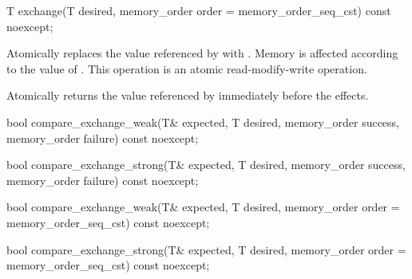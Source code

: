 %
%
%
%
\begin{itemdecl}
T exchange(T desired, memory_order order = memory_order_seq_cst) const noexcept;
\end{itemdecl}

\begin{itemdescr}
\pnum
\effects Atomically replaces the value referenced by 
with .
Memory is affected according to the value of .
This operation is an atomic read-modify-write operation.

\pnum
\returns Atomically returns the value referenced by 
immediately before the effects.
\end{itemdescr}

%
%
%
%
%
%
%
%
\begin{itemdecl}
bool compare_exchange_weak(T& expected, T desired,
                           memory_order success, memory_order failure) const noexcept;

bool compare_exchange_strong(T& expected, T desired,
                             memory_order success, memory_order failure) const noexcept;

bool compare_exchange_weak(T& expected, T desired,
                           memory_order order = memory_order_seq_cst) const noexcept;

bool compare_exchange_strong(T& expected, T desired,
                             memory_order order = memory_order_seq_cst) const noexcept;
\end{itemdecl}

